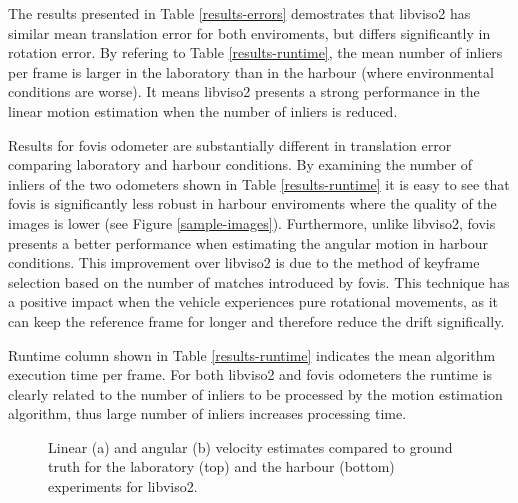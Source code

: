 \documentclass[conference]{IEEEtran}
\begin{document}
The results presented in Table \ref{results-errors} demostrates that libviso2 has similar mean translation error for both enviroments, but differs significantly in rotation error. By refering to Table \ref{results-runtime}, the mean number of inliers per frame is larger in the laboratory than in the harbour (where environmental conditions are worse). It means libviso2 presents a strong performance in the linear motion estimation when the number of inliers is reduced.

Results for fovis odometer are substantially different in translation error comparing laboratory and harbour conditions. By examining the number of inliers of the two odometers shown in Table \ref{results-runtime} it is easy to see that fovis is significantly less robust in harbour enviroments where the quality of the images is lower (see Figure \ref{sample-images}). Furthermore, unlike libviso2, fovis presents a better performance when estimating the angular motion in harbour conditions. This improvement over libviso2 is due to the method of keyframe selection based on the number of matches introduced by fovis. This technique has a positive impact when the vehicle experiences pure rotational movements, as it can keep the reference frame for longer and therefore reduce the drift significally.

Runtime column shown in Table \ref{results-runtime} indicates the mean algorithm execution time per frame. For both libviso2 and fovis odometers the runtime is clearly related to the number of inliers to be processed by the motion estimation algorithm, thus large number of inliers increases processing time.

\begin{figure}
  \begin{center}
  \end{center}
  \caption{Linear (a) and angular (b) velocity estimates compared to ground truth for the laboratory (top) and the harbour (bottom) experiments for libviso2.}
  \label{error-plots-viso2}
\end{figure}
\end{document}
